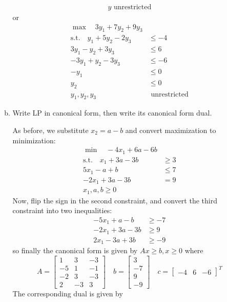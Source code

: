 \documentclass{article}
\begin{document}
\begin{enumerate}
\begin{enumerate}[a)]
\begin{soln}
\begin{align*}
						y\text{ unrestricted}
					\end{align*} or 
					\begin{align*}
						\max\quad 3y_1+7y_2+9y_3 & \\
						\text{s.t.}\quad y_1+5y_2-2y_3 &\le -4 \\
						3y_1-y_2+3y_3 &\le 6 \\
						-3y_1+y_2-3y_3 &\le -6 \\
						-y_1 &\le 0 \\
						y_2 &\le 0 \\
						y_1, y_2, y_3&\text{ unrestricted}
					\end{align*}
				\end{soln}

			\item Write LP in canonical form, then write its canonical form dual.
				\begin{soln}
					As before, we substitute $x_2=a-b$ and convert maximization to minimization:
					\begin{align*}
						\min\quad -4x_1+6a-6b & \\
						\text{s.t.}\quad x_1+3a-3b &\ge 3 \\
						5x_1-a+b &\le 7  \\
						-2x_1+3a-3b &= 9 \\
						x_1, a, b\ge 0
					\end{align*}
					Now, flip the sign in the second constraint, and convert the third constraint into two inequalities:
					\begin{align*}
						-5x_1+a-b &\ge -7 \\
						-2x_1+3a-3b &\ge 9 \\
						2x_1-3a+3b &\ge -9
					\end{align*} so finally the canonical form is given by $Ax\ge b, x\ge 0$ where \[ A=\begin{bmatrix}
							1 & 3 & -3 \\
							-5 & 1 & -1 \\
							-2 & 3 & -3 \\
							2 & -3 & 3
						\end{bmatrix}\quad b=\begin{bmatrix}
							3 \\ -7 \\ 9 \\ -9
						\end{bmatrix}\quad c=\begin{bmatrix}
							-4 & 6 & -6
					\end{bmatrix}^T\] The corresponding dual is given by

\end{soln}
\end{enumerate}
\end{enumerate}
\end{document}
